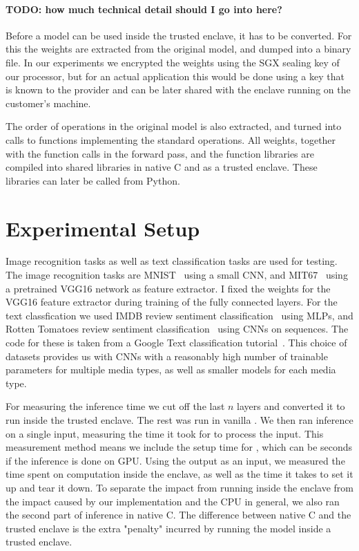 \documentclass[11pt,twocolumn]{article}
\begin{document}
\paragraph{TODO: how much technical detail should I go into here?}
Before a model can be used inside the trusted enclave, it has to be converted.
For this the weights are extracted from the original \tf{} model, and dumped into a binary file.
In our experiments we encrypted the weights using the SGX sealing key of our processor, but for an actual application this would be done using a key that is known to the provider and can be later shared with the enclave running on the customer's machine.

The order of operations in the original model is also extracted, and turned into calls to functions implementing the standard \tf{} operations.
All weights, together with the function calls in the forward pass, and the function libraries are compiled into shared libraries in native C and as a trusted enclave.
These libraries can later be called from Python.

\section{Experimental Setup}
\label{sec:setup}

Image recognition tasks as well as text classification tasks are used for testing.
The image recognition tasks are MNIST~\cite{noauthor_mnist_nodate} using a small CNN, and MIT67~\cite{quattoni_recognizing_nodate} using a pretrained VGG16 network as feature extractor.
I fixed the weights for the VGG16 feature extractor during training of the fully connected layers.
For the text classfication we used IMDB review sentiment classification~\cite{maas_learning_2011} using MLPs, and Rotten Tomatoes review sentiment classification~\cite{noauthor_sentiment_nodate} using CNNs on sequences.
The code for these is taken from a Google Text classification tutorial~\cite{noauthor_googleeng-edu_nodate}.
This choice of datasets provides us with CNNs with a reasonably high number of trainable parameters for multiple media types, as well as smaller models for each media type.

For measuring the inference time we cut off the last $n$ layers and converted it to run inside the trusted enclave.
The rest was run in vanilla \tf{}.
We then ran inference on a single input, measuring the time it took for \tf{} to process the input.
This measurement method means we include the setup time for \tf{}, which can be seconds if the inference is done on GPU.
Using the \tf{} output as an input, we measured the time spent on computation inside the enclave, as well as the time it takes to set it up and tear it down.
To separate the impact from running inside the enclave from the impact caused by our implementation and the CPU in general, we also ran the second part of inference in native C.
The difference between native C and the trusted enclave is the extra "penalty" incurred by running the model inside a trusted enclave.
\end{document}

